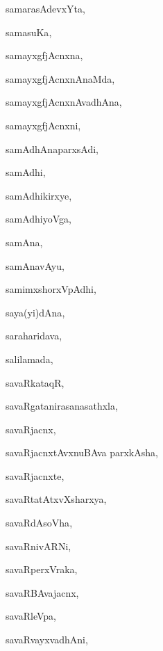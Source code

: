\begin{multicols}{3}
{\noindent
{samarasAdevxYta}, \pageref{samarasAdevxYta}

\noindent
{samasuKa}, \pageref{samasuKa}

\noindent
{samayxgfjAcnxna}, \pageref{samayxgfjAcnxna}

\noindent
{samayxgfjAcnxnAnaMda}, \pageref{samayxgfjAcnxnAnaMda}

\noindent
{samayxgfjAcnxnAvadhAna}, \pageref{samayxgfjAcnxnAvadhAna}

\noindent
{samayxgfjAcnxni}, \pageref{samayxgfjAcnxni}

\noindent
{samAdhAnaparxsAdi}, \pageref{samAdhAnaparxsAdi}

\noindent
{samAdhi}, \pageref{samAdhi}

\noindent
{samAdhikirxye}, \pageref{samAdhikirxye}

\noindent
{samAdhiyoVga}, \pageref{samAdhiyoVga}

\noindent
{samAna}, \pageref{samAna}

\noindent
{samAnavAyu}, \pageref{samAnavAyu}

\noindent
{samimxshorxVpAdhi}, \pageref{samimxshorxVpAdhi}

\noindent
{saya(yi)dAna}, \pageref{sayayidAna}

\noindent
{saraharidava}, \pageref{saraharidava}

\noindent
{salilamada}, \pageref{salilamada}

\noindent
{savaRkataqR}, \pageref{savaRkataqR}

\noindent
{savaRgatanirasanasathxla}, \pageref{savaRgatanirasanasathxla}

\noindent
{savaRjacnx}, \pageref{savaRjacnx}

\noindent
{savaRjacnxtAvxnuBAva parxkAsha}, \pageref{savaRjacnxtAvxnuBAvaparxkAsha}

\noindent
{savaRjacnxte}, \pageref{savaRjacnxte}

\noindent
{savaRtatAtxvXsharxya}, \pageref{savaRtatAtxvXsharxya}

\noindent
{savaRdAsoVha}, \pageref{savaRdAsoVha}

\noindent
{savaRnivARNi}, \pageref{savaRnivARNi}

\noindent
{savaRperxVraka}, \pageref{savaRperxVraka}

\noindent
{savaRBAvajacnx}, \pageref{savaRBAvajacnx}

\noindent
{savaRleVpa}, \pageref{savaRleVpa}

\noindent
{savaRvayxvadhAni}, \pageref{savaRvayxvadhAni}

}
\end{multicols}
